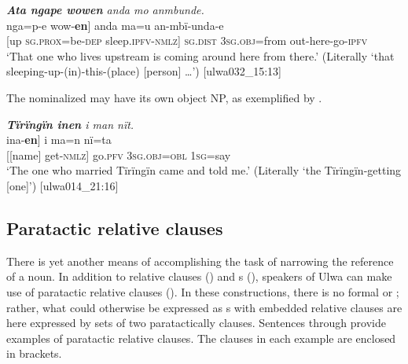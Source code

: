 
\ea%
    \label{ex:complex:98}
          \textit{\textbf{Ata ngape wowen} anda mo anmbunde.}\\
\gll    {[ata}  nga=p-e      {wow{}-\textbf{en}]}      anda     ma=u      an-mbï-unda-e\\
    {[up}    \textsc{sg.prox}=be\textsc{{}-dep} sleep.\textsc{ipfv{}-nmlz]}  \textsc{sg.dist}    3\textsc{sg.obj}=from  out-here-go-\textsc{ipfv}\\
\glt `That one who lives upstream is coming around here from there.’ (Literally ‘that sleeping-up-(in)-this-(place) [person] …’) [ulwa032\_15:13]
\z

The nominalized  may have its own object NP, as exemplified by .

\ea%
    \label{ex:complex:99}
          \textit{\textbf{Tïrïngïn inen} i man nït.}\\
\gll    {[Tïrïngïn}  {ina-\textbf{en}]}    i    ma=n      nï=ta\\
    {[[name]}  get-\textsc{nmlz]}  go.\textsc{pfv}  3\textsc{sg.obj=obl}  1\textsc{sg}=say\\
\glt `The one who married Tïrïngïn came and told me.’ (Literally ‘the Tïrïngïn-getting [one]’) [ulwa014\_21:16]
\z


\subsection{Paratactic relative clauses}\label{sec:12.3.2}


There is yet another means of accomplishing the  task of narrowing the reference of a noun. In addition to relative clauses () and s (), speakers of Ulwa can make use of paratactic relative clauses (\citealt{ComrieKuteva2013}). In these constructions, there is no formal  or  ; rather, what could otherwise be expressed as s with  embedded relative clauses are here expressed by sets of two paratactically  clauses. Sentences  through  provide examples of paratactic relative clauses. The clauses in each example are enclosed in brackets.

